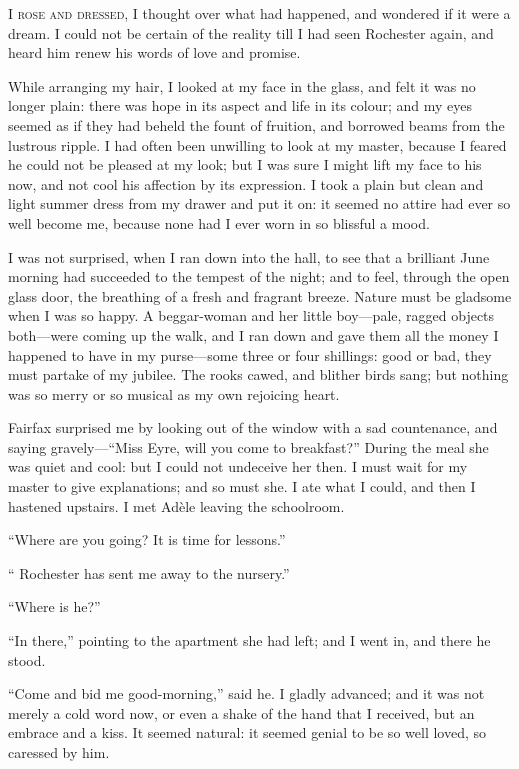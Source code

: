 
 \textsc{I rose and dressed,} I thought over what had happened, and wondered if
it were a dream.  I could not be certain of the reality till I had seen
\Mr{} Rochester again, and heard him renew his words of love and promise.

While arranging my hair, I looked at my face in the glass, and felt it
was no longer plain: there was hope in its aspect and life in its
colour; and my eyes seemed as if they had beheld the fount of fruition,
and borrowed beams from the lustrous ripple.  I had often been unwilling
to look at my master, because I feared he could not be pleased at my
look; but I was sure I might lift my face to his now, and not cool his
affection by its expression.  I took a plain but clean and light summer
dress from my drawer and put it on: it seemed no attire had ever so well
become me, because none had I ever worn in so blissful a mood.

I was not surprised, when I ran down into the hall, to see that a
brilliant June morning had succeeded to the tempest of the night; and to
feel, through the open glass door, the breathing of a fresh and fragrant
breeze.  Nature must be gladsome when I was so happy.  A beggar-woman
and her little boy---pale, ragged objects both---were coming up the
walk, and I ran down and gave them all the money I happened to have in
my purse---some three or four shillings: good or bad, they must partake
of my jubilee.  The rooks cawed, and blither birds sang; but nothing was
so merry or so musical as my own rejoicing heart.

\Mrs{} Fairfax surprised me by looking out of the window with a sad
countenance, and saying gravely---\enquote{Miss Eyre, will you come to
breakfast?}  During the meal she was quiet and cool: but I could not
undeceive her then.  I must wait for my master to give explanations; and
so must she.  I ate what I could, and then I hastened upstairs.  I met
Adèle leaving the schoolroom.

\enquote{Where are you going?  It is time for lessons.}

\enquote{\Mr{} Rochester has sent me away to the nursery.}

\enquote{Where is he?}

\enquote{In there,} pointing to the apartment she had left; and I went
in, and there he stood.

\enquote{Come and bid me good-morning,} said he.  I gladly advanced; and
it was not merely a cold word now, or even a shake of the hand that I
received, but an embrace and a kiss.  It seemed natural: it seemed
genial to be so well loved, so caressed by him.

